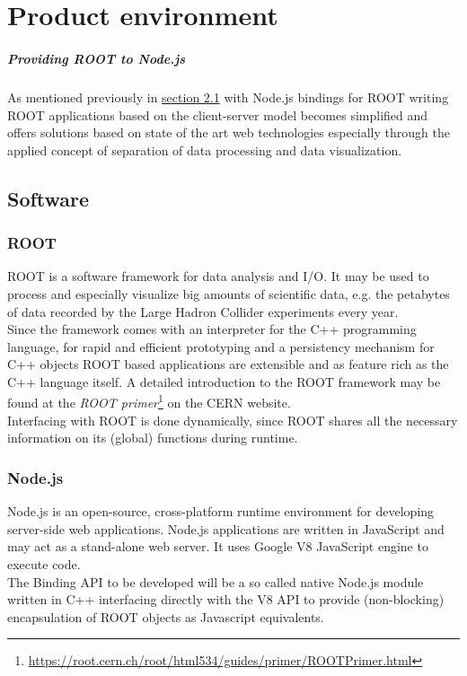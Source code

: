 \chapter{Product environment}

\paragraph{Providing ROOT to Node.js}
As mentioned previously in \hyperlink{section.2.1}{section 2.1} with Node.js bindings for ROOT writing ROOT applications based on the client-server model becomes simplified and offers solutions based on state of the art web technologies especially through the applied concept of separation of data processing and data visualization.  

\section{Software}
\subsection{ROOT}
ROOT is a software framework for data analysis and I/O. It may be used to process and especially visualize big amounts of scientific data, e.g. the petabytes of data recorded by the Large Hadron Collider experiments every year.\\
Since the framework comes with an interpreter for the C++ programming language, for rapid and efficient prototyping and a persistency mechanism for C++ objects ROOT based applications are  extensible and as feature rich as the C++ language itself.
A detailed introduction to the ROOT framework may be found at the \textit{ROOT  primer}\footnote[1]{\url{https://root.cern.ch/root/html534/guides/primer/ROOTPrimer.html}}
on the CERN website.\\
Interfacing with ROOT is done dynamically, since ROOT shares all the necessary information on its (global) functions during runtime.

\subsection{Node.js}
Node.js is an open-source, cross-platform runtime environment for developing server-side web applications. Node.js applications are written in JavaScript and may act as a stand-alone web server. It uses Google V8 JavaScript engine to execute code.\\
The Binding API to be developed will be a so called native Node.js module written in C++ interfacing directly with the V8 API to provide (non-blocking) encapsulation of ROOT objects as Javascript equivalents.

